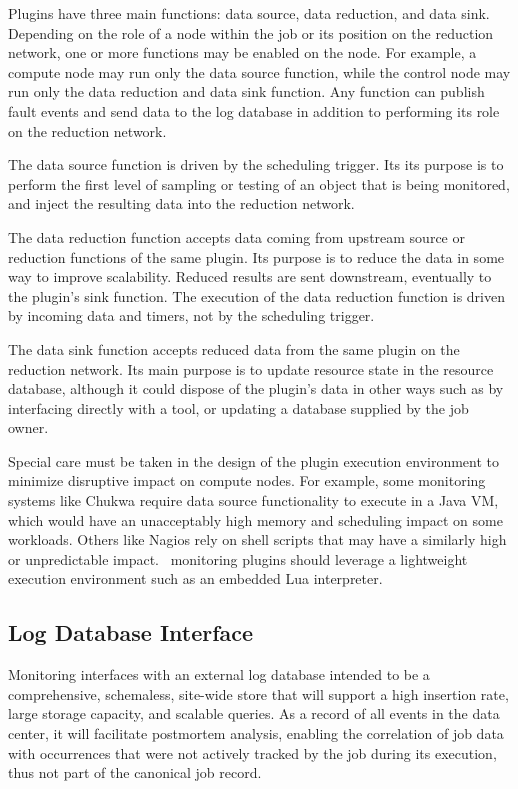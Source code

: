Plugins have three main functions: data source, data reduction,
and data sink.  Depending on the role of a node within the job or
its position on the reduction network,
one or more functions may be enabled on the node.
For example, a compute node may run only the data source function,
while the control node may run only the data reduction and data sink function.
Any function can publish fault events and send data to the log database
in addition to performing its role on the reduction network.

The data source function is driven by the scheduling trigger.
Its its purpose is to perform the first level of sampling or testing
of an object that is being monitored, and inject the resulting data 
into the reduction network.

The data reduction function accepts data coming from upstream source or
reduction functions of the same plugin.
Its purpose is to reduce the data in some way to improve scalability.
Reduced results are sent downstream, eventually to the plugin's sink function.
The execution of the data reduction function is driven by
incoming data and timers, not by the scheduling trigger.

The data sink function accepts reduced data from the same plugin on
the reduction network.
Its main purpose is to update resource state in the resource database,
although it could dispose of the plugin's data in other ways such as by
interfacing directly with a tool, or updating a database supplied by the
job owner.

Special care must be taken in the design of the plugin execution
environment to minimize disruptive impact on compute nodes.
For example, some monitoring systems like Chukwa\cite{Chukwa} require
data source functionality to execute in a Java VM, which would have an
unacceptably high memory and scheduling impact on some workloads.
Others like Nagios\cite{Nagios} rely on shell scripts that may have a
similarly high or unpredictable impact.
\ngrm\ monitoring plugins should leverage a lightweight execution environment
such as an embedded Lua\cite{LuaBook} interpreter.

\subsection{Log Database Interface}

Monitoring interfaces with an external log database intended to
be a comprehensive, schemaless, site-wide store that will support a
high insertion rate, large storage capacity, and scalable queries.
As a record of all events in the data center, it will facilitate
postmortem analysis, enabling the correlation of job data
with occurrences that were not actively tracked by the job during its
execution, thus not part of the canonical job record.

